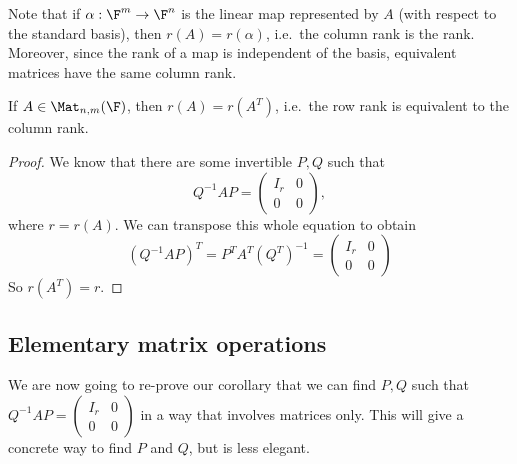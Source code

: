 \documentclass[a4paper]{article}
\begin{document}
Note that if $\alpha: \F^m \to \F^n$ is the linear map represented by $A$ (with respect to the standard basis), then $r(A) = r(\alpha)$, i.e.\ the column rank is the rank. Moreover, since the rank of a map is independent of the basis, equivalent matrices have the same column rank.

\begin{thm}
  If $A \in \Mat_{n, m}(\F)$, then $r(A) = r(A^T)$, i.e.\ the row rank is equivalent to the column rank.
\end{thm}

\begin{proof}
  We know that there are some invertible $P, Q$ such that
  \[
    Q^{-1}AP =
    \begin{pmatrix}
      I_r & 0\\
      0 & 0
    \end{pmatrix},
  \]
  where $r = r(A)$. We can transpose this whole equation to obtain
  \[
    (Q^{-1}AP)^T = P^T A^T (Q^T)^{-1} =
    \begin{pmatrix}
      I_r & 0\\
      0 & 0
    \end{pmatrix}
  \]
  So $r(A^T) = r$.
\end{proof}

\subsection{Elementary matrix operations}
We are now going to re-prove our corollary that we can find $P, Q$ such that $Q^{-1}AP = \begin{pmatrix} I_r & 0\\ 0 & 0 \end{pmatrix}$ in a way that involves matrices only. This will give a concrete way to find $P$ and $Q$, but is less elegant.
\end{document}
